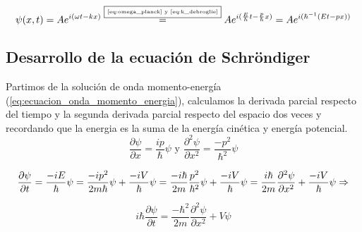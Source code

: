 \begin{equation}
    \label{eq:ecuacion_onda_momento_energia}
    \psi(x,t)=Ae^{i(\omega t-kx)}\overset{\fbox{\tiny \ref{eq:omega_planck} y \ref{eq:k_debroglie}}}{=}Ae^{i(\frac{E}{\hbar} t-\frac{p}{\hbar}x)}=Ae^{i(\hbar^{-1}(E t-p x))}
\end{equation}

\subsection{Desarrollo de la ecuación de Schröndiger}\label{subsec:desarrollo-de-la-ecuación-de-schrondiger}

Partimos de la solución de onda momento-energía (\ref{eq:ecuacion_onda_momento_energia}), calculamos la derivada parcial respecto del tiempo y la segunda derivada parcial respecto del espacio dos veces y recordando que la energia es la suma de la energía cinética y energía potencial.
\begin{equation*}
    \frac{\partial\psi}{\partial x}=\frac{ip}{\hbar}\psi\text{ y }\frac{\partial^2\psi}{\partial x^2}=\frac{-p^2}{\hbar^2}\psi
\end{equation*}

\begin{equation*}
    \frac{\partial\psi}{\partial t}=\frac{-iE}{\hbar}\psi=\frac{-ip^2}{2m\hbar}\psi+\frac{-iV}{\hbar}\psi=\frac{-i\hbar}{2m}\frac{p^2}{\hbar^2}\psi+\frac{-iV}{\hbar}\psi=\frac{i\hbar}{2m}\frac{\partial^2\psi}{\partial x^2}+\frac{-iV}{\hbar}\psi\Rightarrow
\end{equation*}

\begin{equation}
    \label{eq:desarrollo-3ecuacion-schrodinger}
    i\hbar\frac{\partial\psi}{\partial t}=\frac{-\hbar^2}{2m}\frac{\partial^2\psi}{\partial x^2}+V\psi
\end{equation}


